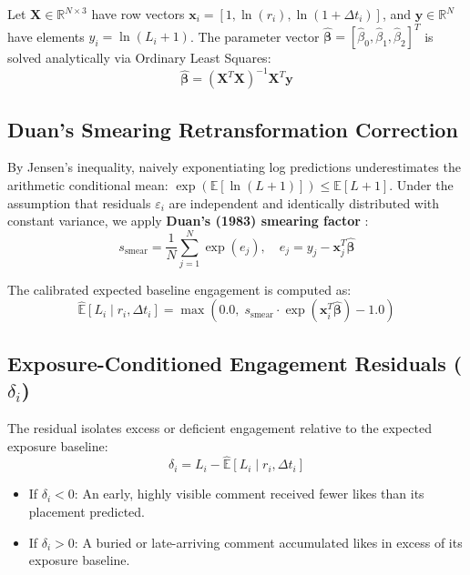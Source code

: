 \documentclass[journal]{IEEEtran}
\begin{document}
Let $\mathbf{X} \in \mathbb{R}^{N \times 3}$ have row vectors $\mathbf{x}_i = [1, \ln(r_i), \ln(1 + \Delta t_i)]$, and $\mathbf{y} \in \mathbb{R}^N$ have elements $y_i = \ln(L_i + 1)$. The parameter vector $\hat{\boldsymbol{\beta}} = [\hat{\beta}_0, \hat{\beta}_1, \hat{\beta}_2]^T$ is solved analytically via Ordinary Least Squares:
\begin{equation}
\hat{\boldsymbol{\beta}} = (\mathbf{X}^T \mathbf{X})^{-1} \mathbf{X}^T \mathbf{y}
\end{equation}

\subsection{Duan's Smearing Retransformation Correction}
By Jensen's inequality, naively exponentiating log predictions underestimates the arithmetic conditional mean: $\exp(\mathbb{E}[\ln(L+1)]) \le \mathbb{E}[L+1]$. Under the assumption that residuals $\varepsilon_i$ are independent and identically distributed with constant variance, we apply \textbf{Duan's (1983) smearing factor} \cite{duan1983smearing}:
\begin{equation}
s_{\text{smear}} = \frac{1}{N} \sum_{j=1}^N \exp(e_j), \quad e_j = y_j - \mathbf{x}_j^T \hat{\boldsymbol{\beta}}
\end{equation}

The calibrated expected baseline engagement is computed as:
\begin{equation}
\hat{\mathbb{E}}[L_i \mid r_i, \Delta t_i] = \max\left(0.0, \; s_{\text{smear}} \cdot \exp(\mathbf{x}_i^T \hat{\boldsymbol{\beta}}) - 1.0\right)
\end{equation}

\subsection{Exposure-Conditioned Engagement Residuals (\texorpdfstring{$\delta_i$}{delta})}
The residual isolates excess or deficient engagement relative to the expected exposure baseline:
\begin{equation}
\delta_i = L_i - \hat{\mathbb{E}}[L_i \mid r_i, \Delta t_i]
\end{equation}
\begin{itemize}
    \item If $\delta_i < 0$: An early, highly visible comment received fewer likes than its placement predicted.
    \item If $\delta_i > 0$: A buried or late-arriving comment accumulated likes in excess of its exposure baseline.
\end{itemize}
\end{document}
